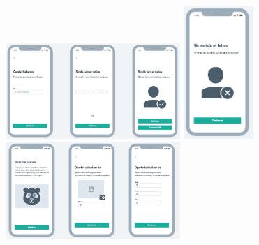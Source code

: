 \begin{center}
\\
\includegraphics[width=250]{exemplos/Wireframe/Wireframe7.PNG}
\includegraphics[width=100]{exemplos/Wireframe/Wireframe7_1.PNG}
\\
\includegraphics[width=250]{exemplos/Wireframe/Wireframe8.PNG}

\end{center}
